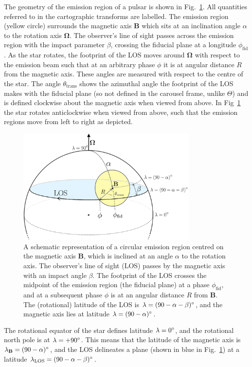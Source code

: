 The geometry of the emission region of a pulsar is shown in Fig.~\ref{fig: geometry derivations - full emission region geometry}. All quantities referred to in the cartographic transforms are labelled. The emission region (yellow circle) surrounds the magnetic axis $\mathbf{B}$ which sits at an inclination angle $\alpha$ to the rotation axis $\mathbf{\Omega}$. The observer's line of sight passes across the emission region with the impact parameter $\beta$, crossing the fiducial plane at a longitude $\phi_\mathrm{fid}$. As the star rotates, the footprint of the LOS moves around $\mathbf{\Omega}$ with respect to the emission beam such that at an arbitrary phase $\phi$ it is at angular distance $R$ from the magnetic axis. These angles are measured with respect to the centre of the star. The angle $\theta_\mathrm{trans}$ shows the azimuthal angle the footprint of the LOS makes with the fiducial plane (so not defined in the carousel frame, unlike $\Theta$) and is defined clockwise about the magnetic axis when viewed from above. In Fig~\ref{fig: geometry derivations - full emission region geometry} the star rotates anticlockwise when viewed from above, such that the emission regions move from left to right as depicted.
\begin{figure}
    \begin{center}
        \includegraphics[width=0.8\textwidth]{Figures/geometry_appendix/full_geom}
        \caption[Emission region geometry]{A schematic representation of a circular emission region centred on the magnetic axis $\mathbf{B}$, which is inclined at an angle $\alpha$ to the rotation axis. The observer's line of sight (LOS) passes by the magnetic axis with an impact angle $\beta$. The footprint of the LOS crosses the midpoint of the emission region (the fiducial plane) at a phase $\phi_\mathrm{fid}$, and at a subsequent phase $\phi$ is at an angular distance $R$ from $\mathbf{B}$. The (rotational) latitude of the LOS is $\lambda = (90-\alpha-\beta)^\circ$, and the magnetic axis lies at latitude $\lambda = (90-\alpha)^\circ$. }
        \label{fig: geometry derivations - full emission region geometry}
    \end{center}
\end{figure}
The rotational equator of the star defines latitude $\lambda = 0^\circ$, and the rotational north pole is at $\lambda = +90^\circ$. This means that the latitude of the magnetic axis is $\lambda_\mathbf{B} = (90 - \alpha)^\circ$, and the LOS delineates a plane (shown in blue in Fig.~\ref{fig: geometry derivations - full emission region geometry}) at a latitude $\lambda_\mathrm{LOS} = (90 - \alpha - \beta)^\circ$.


